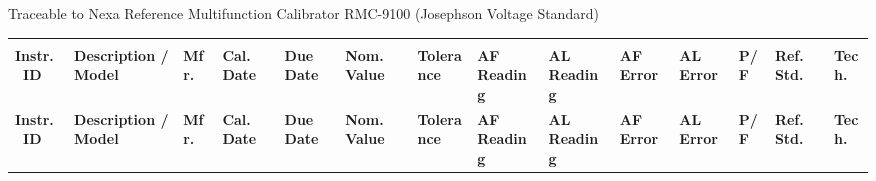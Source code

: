 
\begin{tcolorbox}[
  enhanced,
  colback=SubHeaderBg,
  colframe=SubHeaderBg,
  arc=4pt,
  boxrule=0pt,
  left=8pt, right=4pt, top=4pt, bottom=4pt
]
\hfill{\color{NexaSilver}\small Traceable to Nexa Reference Multifunction Calibrator RMC-9100 (Josephson Voltage Standard)}
\end{tcolorbox}

\vspace{3pt}

\setlength{\arrayrulewidth}{0.4pt}

{\scriptsize
{}
\begin{longtable}{|C{1.5cm}|L{3.2cm}|C{1.5cm}|C{1.4cm}|C{1.4cm}|C{1.4cm}|C{1.4cm}|C{1.2cm}|C{1.4cm}|C{1.3cm}|C{1.4cm}|C{1.2cm}|C{1.4cm}|C{1.2cm}|}

\\
\color{white}\bfseries Instr.\ ID &
\color{white}\bfseries Description / Model &
\color{white}\bfseries Mfr. &
\color{white}\bfseries Cal.\ Date &
\color{white}\bfseries Due Date &
\color{white}\bfseries Nom.\ Value &
\color{white}\bfseries Tolerance &
\color{white}\bfseries AF Reading &
\color{white}\bfseries AL Reading &
\color{white}\bfseries AF Error &
\color{white}\bfseries AL Error &
\color{white}\bfseries P/F &
\color{white}\bfseries Ref.\ Std. &
\color{white}\bfseries Tech. \\
\endfirsthead
{}
\color{white}\bfseries Instr.\ ID &
\color{white}\bfseries Description / Model &
\color{white}\bfseries Mfr. &
\color{white}\bfseries Cal.\ Date &
\color{white}\bfseries Due Date &
\color{white}\bfseries Nom.\ Value &
\color{white}\bfseries Tolerance &
\color{white}\bfseries AF Reading &
\color{white}\bfseries AL Reading &
\color{white}\bfseries AF Error &
\color{white}\bfseries AL Error &
\color{white}\bfseries P/F &
\color{white}\bfseries Ref.\ Std. &
\color{white}\bfseries Tech. \\
\endhead


\end{longtable}}
